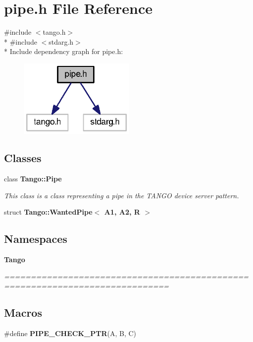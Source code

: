 \section{pipe.\-h File Reference}
\label{pipe_8h}
{\ttfamily \#include $<$tango.\-h$>$}\\*
{\ttfamily \#include $<$stdarg.\-h$>$}\\*
Include dependency graph for pipe.\-h\-:
\nopagebreak
\begin{figure}[H]
\begin{center}
\leavevmode
\includegraphics[width=160pt]{d4/d0f/pipe_8h__incl}
\end{center}
\end{figure}
\subsection*{Classes}
\begin{DoxyCompactItemize}
\item 
class {\bf Tango\-::\-Pipe}
\begin{DoxyCompactList}\small\item\em This class is a class representing a pipe in the T\-A\-N\-G\-O device server pattern. \end{DoxyCompactList}\item 
struct {\bf Tango\-::\-Wanted\-Pipe$<$ A1, A2, R $>$}
\end{DoxyCompactItemize}
\subsection*{Namespaces}
\begin{DoxyCompactItemize}
\item 
{\bf Tango}
\begin{DoxyCompactList}\small\item\em ============================================================================= \end{DoxyCompactList}\end{DoxyCompactItemize}
\subsection*{Macros}
\begin{DoxyCompactItemize}
\item 
\#define {\bf P\-I\-P\-E\-\_\-\-C\-H\-E\-C\-K\-\_\-\-P\-T\-R}(A, B, C)
\end{DoxyCompactItemize}

